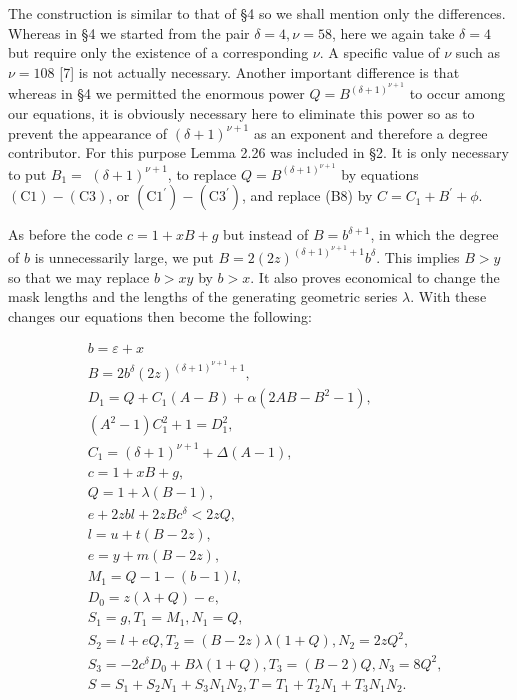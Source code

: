 \documentclass[11pt,a4paper]{article}
\begin{document}
The construction is similar to that of §4 so we shall mention only the differences. Whereas in §4 we started from the pair $\delta=4,\allowbreak  \nu=58$, here we again take $\delta=4$ but require only the existence of a corresponding $\nu$. A specific value of $\nu$ such as $\nu=108$ [7] is not actually necessary. Another important difference is that whereas in §4 we permitted the enormous power $Q=B^{(\delta+1)^{\nu+1}}$ to occur among our equations, it is obviously necessary here to eliminate this power so as to prevent the appearance of $(\delta+1)^{\nu+1}$ as an exponent and therefore a degree contributor. For this purpose Lemma 2.26 was included in §2. It is only necessary to put $B_{1}=$ $(\delta+1)^{\nu+1}$, to replace $Q=B^{(\delta+1)^{\nu+1}}$ by equations $(\mathrm{C}1)-(\mathrm{C}3)$, or $\left(\mathrm{C}1^{\prime}\right)-\left(\mathrm{C}3^{\prime}\right)$, and replace (B8) by $C=C_1+B^{\prime}+\phi$.

As before the code $c=1+x B+g$ but instead of $B=b^{\delta+1}$, in which the degree of $b$ is unnecessarily large, we put $B=2(2 z)^{(\delta+1)^{\nu+1}+1} b^{\delta}$. This implies $B>y$ so that we may replace $b>x y$ by $b>x$. It also proves economical to change the mask lengths and the lengths of the generating geometric series $\lambda$. With these changes our equations then become the following:


\begin{align*}
& b=\varepsilon+x  \tag{D1}\\
& B=2b^{\delta}(2z)^{(\delta+1)^{\nu+1}+1},  \tag{D2}\\
& D_{1}=Q+C_{1}(A-B)+\alpha\left(2 A B-B^{2}-1\right),  \tag{D3}\\
& \left(A^{2}-1\right) C_{1}^{2}+1=D_{1}^{2},  \tag{D4}\\
& C_{1}=(\delta+1)^{\nu+1}+\Delta(A-1),  \tag{D5}\\
& c=1+x B+g,  \tag{D6}\\
& Q=1+\lambda(B-1),  \tag{D7}\\
& e+2 z b l+2 z B c^{\delta}<2 z Q,  \tag{D8}\\
& l=u+t(B-2 z),  \tag{D9}\\
& e=y+m(B-2 z),  \tag{D10}\\
& M_{1}=Q-1-(b-1) l,  \tag{D11}\\
& D_{0}=z(\lambda+Q)-e,  \tag{D12}\\
& S_{1}=g, T_{1}=M_{1}, N_{1}=Q,  \tag{D13}\\
& S_{2}=l+e Q, T_{2}=(B-2 z) \lambda(1+Q), N_{2}=2 z Q^{2},  \tag{D14}\\
& S_{3}=-2 c^{\delta} D_{0}+B \lambda(1+Q), T_{3}=(B-2) Q, N_{3}=8 Q^{2},  \tag{D15}\\
& S=S_{1}+S_{2} N_{1}+S_{3} N_{1} N_{2}, T=T_{1}+T_{2} N_{1}+T_{3} N_{1} N_{2} . \tag{D16}
\end{align*}
\end{document}
